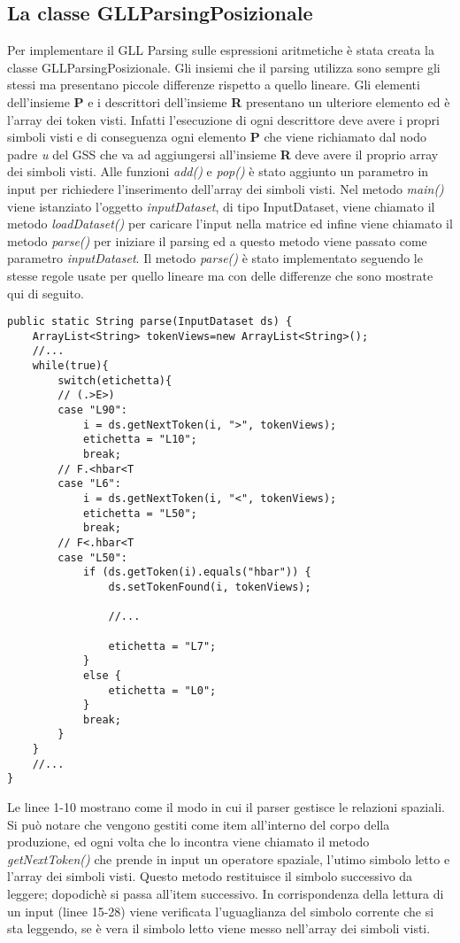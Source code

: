 \subsection{La classe GLLParsingPosizionale}
Per implementare il GLL Parsing sulle espressioni aritmetiche è stata creata la classe GLLParsingPosizionale. Gli insiemi che il parsing utilizza sono sempre gli stessi ma presentano piccole differenze rispetto a quello lineare. Gli elementi dell'insieme \textbf{P} e i descrittori dell'insieme \textbf{R} presentano un ulteriore elemento ed è l'array dei token visti. Infatti l'esecuzione di ogni descrittore deve avere i propri simboli visti e di conseguenza ogni elemento \textbf{P} che viene richiamato dal nodo padre \textit{u} del GSS che va ad aggiungersi all'insieme \textbf{R} deve avere il proprio array dei simboli visti.  Alle funzioni \textit{add()} e \textit{pop()} è stato aggiunto un parametro in input per richiedere l'inserimento dell'array dei simboli visti. Nel metodo \textit{main()} viene istanziato l'oggetto \textit{inputDataset}, di tipo InputDataset, viene chiamato il metodo \textit{loadDataset()} per caricare l'input nella matrice ed infine viene chiamato il metodo \textit{parse()} per iniziare il parsing ed a questo metodo viene passato come parametro \textit{inputDataset}. Il metodo \textit{parse()} è stato implementato seguendo le stesse regole usate per quello lineare ma con delle differenze che sono mostrate qui di seguito.
\begin{lstlisting}
public static String parse(InputDataset ds) {
	ArrayList<String> tokenViews=new ArrayList<String>();
	//...
	while(true){
		switch(etichetta){
		// (.>E>)
		case "L90":
			i = ds.getNextToken(i, ">", tokenViews);
			etichetta = "L10";
			break;
		// F.<hbar<T
		case "L6":
			i = ds.getNextToken(i, "<", tokenViews);
			etichetta = "L50";
			break;
		// F<.hbar<T
		case "L50":
			if (ds.getToken(i).equals("hbar")) {
				ds.setTokenFound(i, tokenViews);
			
				//...
			
				etichetta = "L7";
			} 
			else {
				etichetta = "L0";
			}
			break;
		}
	}
	//...
}
\end{lstlisting}
Le linee 1-10 mostrano come il modo in cui il parser gestisce le relazioni spaziali. Si può notare che vengono gestiti come item all'interno del corpo della produzione, ed ogni volta che lo incontra viene chiamato il metodo \textit{getNextToken()} che prende in input un operatore spaziale, l'utimo simbolo letto e l'array dei simboli visti. Questo metodo restituisce il simbolo successivo da leggere; dopodichè si passa all'item successivo. In corrispondenza della lettura di un input (linee 15-28) viene verificata l'uguaglianza del simbolo corrente che si sta leggendo, se è vera il simbolo letto viene messo nell'array dei simboli visti.
